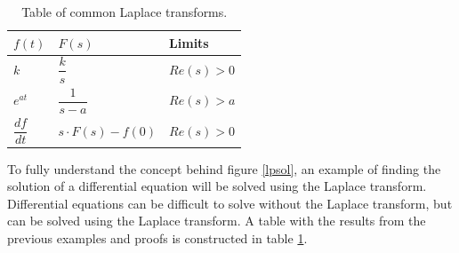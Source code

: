 \begin{table}[H]
\center
\begin{tabular}{lll}
\hline
\multicolumn{1}{|l|}{$f(t)$}           & \multicolumn{1}{l|}{$F(s)$}                & \multicolumn{1}{l|}{Limits}    \\ \hline
\multicolumn{1}{|l|}{$k$}              & \multicolumn{1}{l|}{$\dfrac{k}{s}$}        & \multicolumn{1}{l|}{$Re(s)>0$} \\ \hline
\multicolumn{1}{|l|}{$e^{at}$}         & \multicolumn{1}{l|}{$\dfrac{1}{s-a}$}      & \multicolumn{1}{l|}{$Re(s)>a$} \\ \hline
\multicolumn{1}{|l|}{$\dfrac{df}{dt}$} & \multicolumn{1}{l|}{$s \cdot F(s) - f(0)$} & \multicolumn{1}{l|}{$Re(s)>0$} \\ \hline                          
\end{tabular}
\caption{Table of common Laplace transforms.}
\label{lptable}
\end{table}
\noindent To fully understand the concept behind figure \ref{lpsol}, an example of finding the solution of a differential equation will be solved using the Laplace transform. Differential equations can be difficult to solve without the Laplace transform, but can be solved using the Laplace transform. A table with the results from the previous examples and proofs is constructed in table \ref{lptable}.
\\
